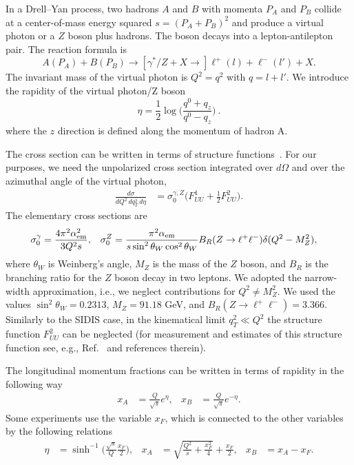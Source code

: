 \documentclass[aps,preprintnumbers,showpacs,nofootinbib,superscriptaddress,floatfix]{revtex4}
\begin{document}
In a Drell--Yan process, two hadrons $A$ and $B$ with momenta $P_A$ and $P_B$
collide at a center-of-mass energy squared $s = (P_A + P_B)^2$ 
and produce a virtual photon or a $Z$ boson plus hadrons. 
The boson decays into a
lepton-antilepton pair. The reaction formula is
\begin{equation}
A(P_A)+B(P_B)\to [\gamma^*/Z + X \to] \ell^+(l) + \ell^-(l') + X.
\end{equation} 
The invariant mass of the virtual photon is $Q^2=q^2$ with $q = l + l'$. 
We introduce the rapidity of the virtual photon/Z boson
\begin{equation}
\eta=\frac{1}{2}\log\bigg(\frac{q^0+q_z}{q^0-q_z}\bigg)\  .
\end{equation} 
where the $z$ direction is defined along the momentum of hadron A.

The cross section can be written in terms of structure
functions~\cite{Boer:2006eq,Arnold:2008kf}. For our purposes, we need the unpolarized 
cross section
integrated over $d\Omega$ and over the azimuthal angle of the virtual photon, 
\begin{align}
\label{e:dsigma_gZ}
\frac{d\sigma}{dQ^2\, dq_T^2\,d\eta} &= \sigma_0^{\gamma,Z}
\bigg(F_{UU}^1 + \frac{1}{2} F_{UU}^2\bigg). 
\end{align} 
The elementary cross sections are
\begin{align}
\label{e:elem_cs_sig0}
\sigma_0^{\gamma} &= \frac{4\pi^2 \alpha^2_{\rm em}}{3 Q^2 s},
&
\sigma_0^Z &= 
\frac{\pi^2 \alpha_{\rm em}}{s \sin^2{\theta_W} \cos^2{\theta_W}}
B_R(Z\rightarrow \ell^+\ell^-)
\delta(Q^2 - M_Z^2), 
\label{e:elem_cs_sig0}
\end{align} 
where $\theta_W$ is Weinberg's angle, $M_Z$ is the mass of the $Z$ boson, and
$B_R$ is the branching ratio for the $Z$ boson decay in two leptons.
We adopted the narrow-width approximation, i.e., we neglect contributions for 
$Q^2 \neq M_Z^2$. 
We used the values 
$\sin^2 \theta_W= 0.2313$, $M_Z = 91.18$ GeV, and 
$B_R(Z\rightarrow \ell^+\ell^-)=3.366$.  
Similarly to the SIDIS case, in the kinematical limit $q_T^2 \ll Q^2$ 
the structure function $F_{UU}^2$ can be neglected 
(for measurement and estimates of this
structure function see, e.g.,
Ref.~\cite{Lambertsen:2016wgj} and references therein). 

The longitudinal momentum fractions can be written in terms of
rapidity in the following way 
\begin{align}
x_A &= \frac{Q}{\sqrt{s}} e^{\eta},
&
x_B &= \frac{Q}{\sqrt{s}} e^{-\eta}.
\label{xab}
\end{align} 
Some experiments use the variable $x_F$, which is connected to the other
variables  by the following relations
\begin{align}
\label{e:eta_xf}
\eta &= \sinh^{-1}\bigg(\frac{\sqrt{s}}{Q}\frac{x_F}{2}\bigg),
& 
x_{A} &= \sqrt{\frac{Q^2}{s} + \frac{x_F^2}{4}} + \frac{x_F}{2},
&
x_B &= x_A - x_F.  
\end{align} 
\end{document}
